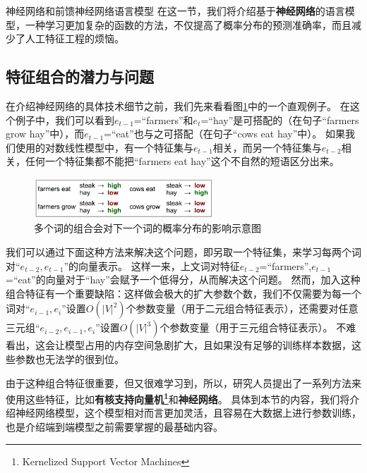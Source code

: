 \documentclass[10pt,a4paper]{ctexart}
\makeatletter
\renewcommand{\section}{\@startsection{section}{1}{0mm}
  {-\baselineskip}{0.5\baselineskip}{\bf\leftline}}
\makeatother
\begin{document}

\newpage

\section{神经网络和前馈神经网络语言模型}
在这一节，我们将介绍基于\textbf{神经网络}的语言模型，一种学习更加复杂的函数的方法，不仅提高了概率分布的预测准确率，而且减少了人工特征工程的烦恼。

\subsection{特征组合的潜力与问题}
在介绍神经网络的具体技术细节之前，我们先来看看图\ref{fig:6}中的一个直观例子。
在这个例子中，我们可以看到$e_{t-1}$=“farmers”和$e_t$=“hay”是可搭配的（在句子“farmers grow hay”中），而$e_{t-1}$=“eat”也与之可搭配（在句子“cows eat hay”中）。
如果我们使用的对数线性模型中，有一个特征集与$e_{t-1}$相关，而另一个特征集与$e_{t-2}$相关，任何一个特征集都不能把“farmers eat hay”这个不自然的短语区分出来。

\begin{figure}[H]
\centering
\includegraphics[width=0.6\textwidth]{fig6.png}
\caption{多个词的组合会对下一个词的概率分布的影响示意图}
\label{fig:6}
\end{figure}

我们可以通过下面这种方法来解决这个问题，即另取一个特征集，来学习每两个词对“$e_{t-2},e_{t-1}$”的向量表示。
这样一来，上文词对特征$e_{t-2}$=“farmers”,$e_{t-1}$=“eat”的向量对于“hay”会赋予一个低得分，从而解决这个问题。
然而，加入这种组合特征有一个重要缺陷：这样做会极大的扩大参数个数，我们不仅需要为每一个词对“$e_{i-1},e_i$”设置$O(|V|^2)$个参数变量（用于二元组合特征表示），还需要对任意三元组“$e_{i-2},e_{i-1},e_i$”设置$O(|V|^3)$个参数变量（用于三元组合特征表示）。
不难看出，这会让模型占用的内存空间急剧扩大，且如果没有足够的训练样本数据，这些参数也无法学的很到位。

由于这种组合特征很重要，但又很难学习到，所以，研究人员提出了一系列方法来使用这些特征，比如\textbf{有核支持向量机\footnote{Kernelized Support Vector Machines}}\cite{cortes1995support}和\textbf{神经网络}\cite{rumelhart1988learning,goldberg2016primer}。
具体到本节的内容，我们将介绍神经网络模型，这个模型相对而言更加灵活，且容易在大数据上进行参数训练，也是介绍端到端模型之前需要掌握的最基础内容。
\end{document}
